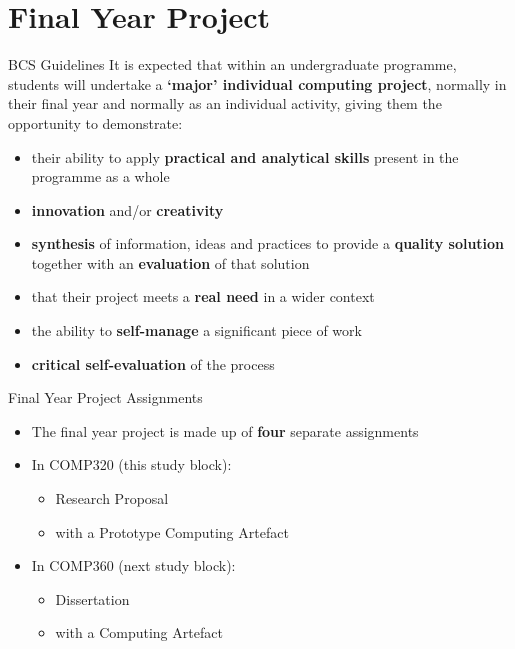 \part{Final Year Project}
\frame{\partpage}

\begin{frame}{BCS Guidelines}
	It is expected that within an undergraduate programme, students will undertake a \textbf{`major' individual computing project}, normally in
	their final year and normally as an individual activity, giving them the opportunity to demonstrate:

	\begin{itemize}
		\pause\item their ability to apply \textbf{practical and analytical skills} present in the programme as a whole
		\pause\item \textbf{innovation} and/or \textbf{creativity}
		\pause\item \textbf{synthesis} of information, ideas and practices to provide a \textbf{quality solution} together with an \textbf{evaluation} of that solution
		\pause\item that their project meets a \textbf{real need} in a wider context
		\pause\item the ability to \textbf{self-manage} a significant piece of work
		\pause\item \textbf{critical self-evaluation} of the process
	\end{itemize}
\end{frame}

\begin{frame}{Final Year Project Assignments}
	\begin{itemize}
		\pause\item The final year project is made up of \textbf{four} separate assignments
		\pause\item In COMP320 (this study block):
		\begin{itemize}
			\item Research Proposal
			\item with a Prototype Computing Artefact
		\end{itemize}
		\pause\item In COMP360 (next study block):
		\begin{itemize}
			\item Dissertation
			\item with a Computing Artefact
		\end{itemize}
	\end{itemize}
\end{frame}

